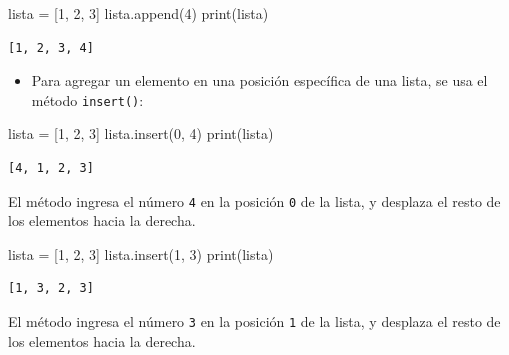 \documentclass[
  letterpaper,
  DIV=11,
  numbers=noendperiod]{scrreprt}
\newenvironment{Shaded}{\begin{snugshade}}{\end{snugshade}}
\newcommand{\BuiltInTok}[1]{\textcolor[rgb]{0.00,0.23,0.31}{#1}}
\newcommand{\DecValTok}[1]{\textcolor[rgb]{0.68,0.00,0.00}{#1}}
\newcommand{\NormalTok}[1]{\textcolor[rgb]{0.00,0.23,0.31}{#1}}
\newcommand{\OperatorTok}[1]{\textcolor[rgb]{0.37,0.37,0.37}{#1}}
\providecommand{\tightlist}{%
  \setlength{\itemsep}{0pt}\setlength{\parskip}{0pt}}\usepackage{longtable,booktabs,array}
\begin{document}
\begin{Shaded}
\begin{Highlighting}[]
\NormalTok{lista }\OperatorTok{=}\NormalTok{ [}\DecValTok{1}\NormalTok{, }\DecValTok{2}\NormalTok{, }\DecValTok{3}\NormalTok{]}
\NormalTok{lista.append(}\DecValTok{4}\NormalTok{)}
\BuiltInTok{print}\NormalTok{(lista)}
\end{Highlighting}
\end{Shaded}

\begin{verbatim}
[1, 2, 3, 4]
\end{verbatim}

\begin{itemize}
\tightlist
\item
  Para agregar un elemento en una posición específica de una lista, se
  usa el método \texttt{insert()}:
\end{itemize}

\begin{Shaded}
\begin{Highlighting}[]
\NormalTok{lista }\OperatorTok{=}\NormalTok{ [}\DecValTok{1}\NormalTok{, }\DecValTok{2}\NormalTok{, }\DecValTok{3}\NormalTok{]}
\NormalTok{lista.insert(}\DecValTok{0}\NormalTok{, }\DecValTok{4}\NormalTok{)}
\BuiltInTok{print}\NormalTok{(lista)}
\end{Highlighting}
\end{Shaded}

\begin{verbatim}
[4, 1, 2, 3]
\end{verbatim}

El método ingresa el número \texttt{4} en la posición \texttt{0} de la
lista, y desplaza el resto de los elementos hacia la derecha.

\begin{Shaded}
\begin{Highlighting}[]
\NormalTok{lista }\OperatorTok{=}\NormalTok{ [}\DecValTok{1}\NormalTok{, }\DecValTok{2}\NormalTok{, }\DecValTok{3}\NormalTok{]}
\NormalTok{lista.insert(}\DecValTok{1}\NormalTok{, }\DecValTok{3}\NormalTok{)}
\BuiltInTok{print}\NormalTok{(lista)}
\end{Highlighting}
\end{Shaded}

\begin{verbatim}
[1, 3, 2, 3]
\end{verbatim}

El método ingresa el número \texttt{3} en la posición \texttt{1} de la
lista, y desplaza el resto de los elementos hacia la derecha.
\end{document}
